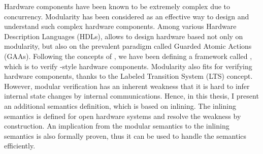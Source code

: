 % 
% 
%

Hardware components have been known to be extremely complex due to
concurrency. Modularity has been considered as an effective way to
design and understand such complex hardware components. Among various
Hardware Description Languages (HDLs), \Bluespec{} allows to design
hardware based not only on modularity, but also on the prevalent
paradigm called Guarded Atomic Actions (GAAs). Following the concepts
of \Bluespec{}, we have been defining a framework called \Kami{},
which is to verify \Bluespec{}-style hardware components. Modularity
also fits for verifying hardware components, thanks to the Labeled
Transition System (LTS) concept. However, modular verification has an
inherent weakness that it is hard to infer internal state changes by
internal communications. Hence, in this thesis, I present an
additional semantics definition, which is based on inlining. The
inlining semantics is defined for open hardware systems and resolve
the weakness by construction. An implication from the modular
semantics to the inlining semantics is also formally proven, thus it
can be used to handle the semantics efficiently.

